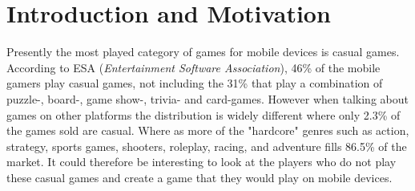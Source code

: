 \chapter{Introduction and Motivation}
Presently the most played category of games for mobile devices is casual games.
According to ESA\cite{ESA}\cite{ESApdf} (\textit{Entertainment Software Association}), 46\% of the mobile gamers play casual games, not including the 31\% that play a combination of puzzle-, board-, game show-, trivia- and card-games.
However when talking about games on other platforms the distribution is widely different where only 2.3\% of the games sold are casual\cite{ESApdf}.
Where as more of the "hardcore" genres such as  action, strategy, sports games, shooters, roleplay, racing, and adventure fills 86.5\% of the market\cite{ESApdf}.
It could therefore be interesting to look at the players who do not play these casual games and create a game that they would play on mobile devices.

\label{sec:specifyingtheproblemstatement}



%
